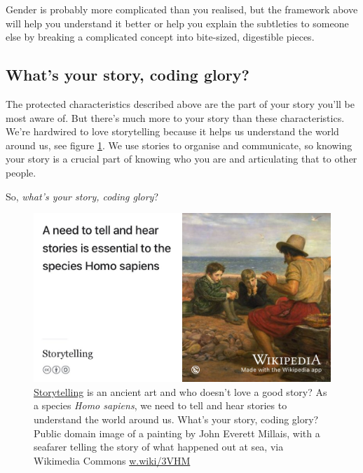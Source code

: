\documentclass[
]{book}
\begin{document}
Gender is probably more complicated than you realised, but the framework above will help you understand it better or help you explain the subtleties to someone else by breaking a complicated concept into bite-sized, digestible pieces.

\hypertarget{story}{%
\subsection{What's your story, coding glory?}\label{story}}

The protected characteristics described above are the part of your story you'll be most aware of. But there's much more to your story than these characteristics. We're hardwired to love storytelling because it helps us understand the world around us, see figure \ref{fig:storytelling-fig}. We use stories to organise and communicate, so knowing your story is a crucial part of knowing who you are and articulating that to other people.

So, \emph{what's your story, coding glory}? \citep{whatsthestory}

\begin{figure}

{\centering \includegraphics[width=1\linewidth]{images/storytelling} 

}

\caption{\href{https://en.wikipedia.org/wiki/Storytelling}{Storytelling} is an ancient art and who doesn't love a good story? As a species \emph{Homo sapiens}, we need to tell and hear stories to understand the world around us. What's your story, coding glory? Public domain image of a painting by John Everett Millais, with a seafarer telling the story of what happened out at sea, via Wikimedia Commons \href{https://w.wiki/3VHM}{w.wiki/3VHM}}\label{fig:storytelling-fig}
\end{figure}
\end{document}
